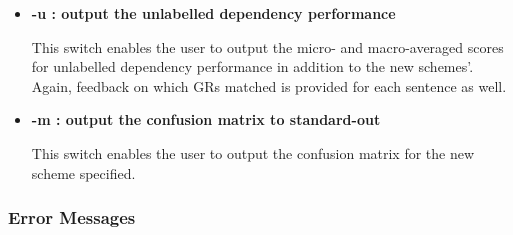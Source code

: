 \documentclass[10pt]{article}
\begin{document}
\begin{itemize}
\item {\bf -u : output the unlabelled dependency performance}

This switch enables the user to output the micro- and macro-averaged
scores for unlabelled dependency performance in addition
to the new schemes'. 
Again, feedback on which GRs matched is provided 
for each sentence as well.

\item {\bf -m : output the confusion matrix to standard-out}

This switch enables the user to output the confusion matrix for the
new scheme specified.

\end{itemize}

\subsubsection{Error Messages}
\end{document}
